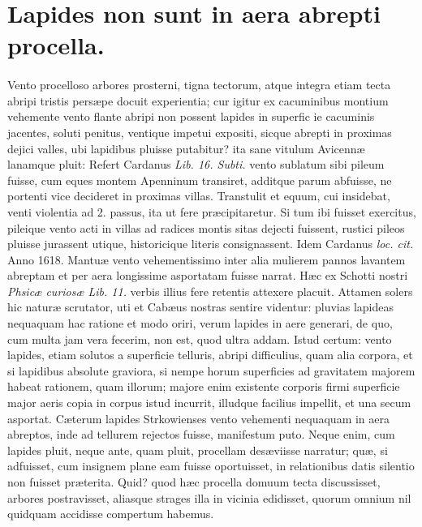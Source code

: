 \documentclass[a4paper, 11pt, oneside, polutonikogreek, latin]{article}
\begin{document}
\section{Lapides non sunt in aera abrepti procella.}
\paragraph{}
Vento procelloso arbores prosterni, tigna tectorum, atque integra etiam tecta abripi tristis persæpe docuit experientia; cur igitur ex cacuminibus montium vehemente vento flante abripi non possent lapides in superfic ie cacuminis jacentes, soluti penitus, ventique impetui expositi, sicque abrepti in proximas dejici valles, ubi lapidibus pluisse putabitur? ita sane vitulum Avicennæ lanamque pluit: Refert Cardanus \emph{Lib. 16. Subti.} vento sublatum sibi pileum fuisse, cum eques montem Apenninum transiret, additque parum abfuisse, ne portenti vice decideret in proximas villas. Transtulit et equum, cui insidebat, venti violentia ad 2. passus, ita ut fere præcipitaretur. Si tum ibi fuisset exercitus, pileique vento acti in villas ad radices montis sitas dejecti fuissent, rustici pileos pluisse jurassent utique, historicique literis consignassent. Idem Cardanus \emph{loc. cit.} Anno 1618. Mantuæ vento vehementissimo inter alia mulierem pannos lavantem abreptam et per aera longissime asportatam fuisse narrat. Hæc ex Schotti nostri \emph{Phsicæ curiosæ Lib. 11.} verbis illius fere retentis attexere placuit. Attamen solers hic naturæ scrutator, uti et Cabæus nostras sentire videntur: pluvias lapideas nequaquam hac ratione et modo oriri, verum lapides in aere generari, de quo, cum multa jam vera fecerim, non est, quod ultra addam. Istud certum: vento lapides, etiam solutos a superficie telluris, abripi difficulius, quam alia corpora, et si lapidibus absolute graviora, si nempe horum superficies ad gravitatem majorem habeat rationem, quam illorum; majore enim existente corporis firmi superficie major aeris copia in corpus istud incurrit, illudque facilius impellit, et una secum asportat. Cæterum lapides Strkowienses vento vehementi nequaquam in aera abreptos, inde ad tellurem rejectos fuisse, manifestum puto. Neque enim, cum lapides pluit, neque ante, quam pluit, procellam desæviisse narratur; quæ, si adfuisset, cum insignem plane eam fuisse oportuisset, in relationibus datis silentio non fuisset præterita. Quid? quod hæc procella domuum tecta discussisset, arbores postravisset, aliasque strages illa in vicinia edidisset, quorum omnium nil quidquam accidisse compertum habemus.
\clearpage
\end{document}

